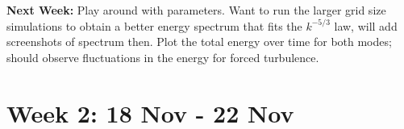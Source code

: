 \documentclass[12pt,letterpaper]{article}
\begin{document}
  \textbf{Next Week:} Play around with parameters. Want to run the larger grid size simulations to obtain a better energy spectrum that fits the $k^{-5/3}$ law, will add screenshots of spectrum then. Plot the total energy over time for both modes; should observe fluctuations in the energy for forced turbulence.


  \section*{Week 2: 18 Nov - 22 Nov}
\end{document}
